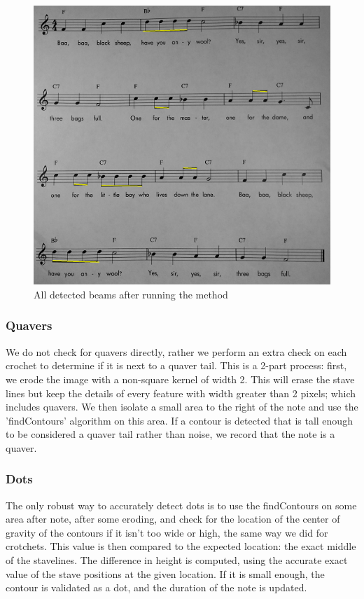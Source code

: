 \begin{figure}[h!]
    \centering
    \includegraphics[width=1\textwidth]{./assets/beamsdetected.png}
    \caption{All detected beams after running the method}
    \label{image:beamsdetected}
\end{figure}

\subsubsection{Quavers}

We do not check for quavers directly, rather we perform an extra check on each crochet to determine if it is next to a quaver tail. This is a 2-part process: first, we erode the image with a non-square kernel of width 2. This will erase the stave lines but keep the details of every feature with width greater than 2 pixels; which includes
quavers. We then isolate a small area to the right of the note and use the 'findContours' algorithm on this area. If a contour is detected that is tall enough to be considered a quaver tail rather than noise, we record that the note is a quaver.

\subsubsection{Dots}

The only robust way to accurately detect dots is to use the findContours on some area after note, after some eroding, and check for the location of the center of gravity of the contours if it isn't too wide or high, the same way we did for crotchets. This value is then compared to the expected location: the exact middle of
the stavelines. The difference in height is computed, using the accurate exact value of the stave positions at the given location. If it is small enough, the contour is validated as a dot, and the duration of the note is updated.

